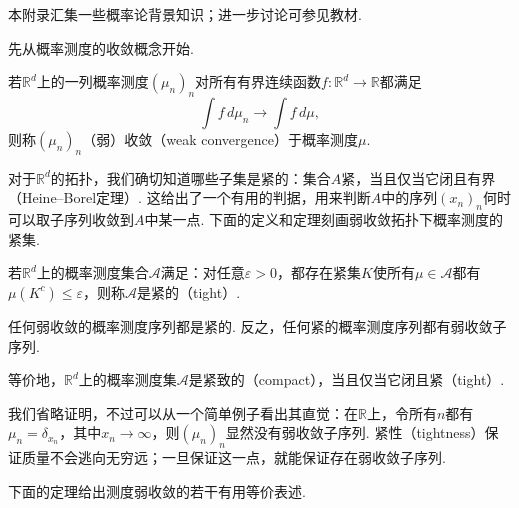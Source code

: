 本附录汇集一些概率论背景知识；进一步讨论可参见教材\cite{ref38}.

先从概率测度的收敛概念开始.
\begin{definition}\label{def:B.1}
若$\mathbb R^d$上的一列概率测度$(\mu_n)_n$对所有有界连续函数$f:\mathbb R^d\to\mathbb R$都满足
$$
\int f\,d\mu_n\longrightarrow\int f\,d\mu,
$$
则称$(\mu_n)_n$（弱）收敛（weak convergence）于概率测度$\mu$.
\end{definition}

对于$\mathbb R^d$的拓扑，我们确切知道哪些子集是紧的：集合$A$紧，当且仅当它闭且有界（Heine--Borel定理）. 这给出了一个有用的判据，用来判断$A$中的序列$(x_n)_n$何时可以取子序列收敛到$A$中某一点. 下面的定义和定理刻画弱收敛拓扑下概率测度的紧集.

\begin{definition}\label{def:B.2}
若$\mathbb R^d$上的概率测度集合$\mathcal A$满足：对任意$\varepsilon>0$，都存在紧集$K$使所有$\mu\in\mathcal A$都有$\mu(K^c)\leq\varepsilon$，则称$\mathcal A$是紧的（tight）.
\end{definition}

\begin{theorem}[Prokhorov定理]\label{thm:B.3}
任何弱收敛的概率测度序列都是紧的. 反之，任何紧的概率测度序列都有弱收敛子序列.

等价地，$\mathbb R^d$上的概率测度集$\mathcal A$是紧致的（compact），当且仅当它闭且紧（tight）.
\end{theorem}

我们省略证明，不过可以从一个简单例子看出其直觉：在$\mathbb R$上，令所有$n$都有$\mu_n=\delta_{x_n}$，其中$x_n\to\infty$，则$(\mu_n)_n$显然没有弱收敛子序列. 紧性（tightness）保证质量不会逃向无穷远；一旦保证这一点，就能保证存在弱收敛子序列.

下面的定理给出测度弱收敛的若干有用等价表述.

